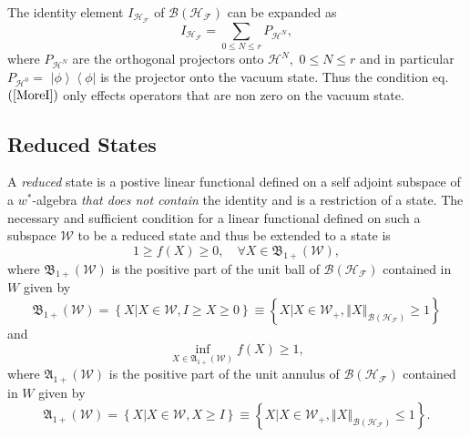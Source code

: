 \documentclass[aps,preprint]{revtex4}%
\begin{document}
The identity element $I_{\mathcal{H}_{\mathcal{F}}}$ of $\mathcal{B}\left(
\mathcal{H}_{\mathcal{F}}\right)  $ can be expanded as
\begin{equation}
I_{\mathcal{H}_{\mathcal{F}}}=\sum_{0\leq N\leq r}P_{\mathcal{H}^{N}},
\end{equation}
where $P_{\mathcal{H}^{N}}$ are the orthogonal projectors onto $\mathcal{H}%
^{N},$ $0\leq N\leq r$ and in particular $P_{\mathcal{H}^{0}}=$ $\left\vert
\phi\right\rangle \left\langle \phi\right\vert $ is the projector onto the
vacuum state. Thus the condition eq.$\left(  \ref{MoreI}\right)  $ only
effects operators that are non zero on the vacuum state.

\subsection{Reduced States \label{Reduced States}}

A \emph{reduced} state is a postive linear functional defined on a self
adjoint subspace of a $w^{\ast}$-algebra \emph{that does not contain} the
identity and is a restriction of a state. The necessary and sufficient
condition \cite{Segal} for a linear functional defined on such a subspace
$\mathcal{W}$ to be a reduced state and thus be extended to a state is
\begin{equation}
1\geq f\left(  X\right)  \geq0,\quad\forall X\in\mathfrak{B}_{1+}\left(
\mathcal{W}\right)  ,
\end{equation}
where $\mathfrak{B}_{1+}\left(  \mathcal{W}\right)  $ is the positive part of
the unit ball of $\mathcal{B}\left(  \mathcal{H}_{\mathcal{F}}\right)  $
contained in $W$ given by%
\begin{equation}
\mathfrak{B}_{1+}\left(  \mathcal{W}\right)  =\left\{  \left.  X\right\vert
X\in\mathcal{W},I\geq X\geq0\right\}  \equiv\left\{  \left.  X\right\vert
X\in\mathcal{W}_{+},\left\Vert X\right\Vert _{\mathcal{B}\left(
\mathcal{H}_{\mathcal{F}}\right)  }\geq1\right\}  \label{BallCond}%
\end{equation}
and
\begin{equation}
\inf_{X\in\mathfrak{A}_{1+}\left(  \mathcal{W}\right)  }f\left(  X\right)
\geq1,
\end{equation}
where $\mathfrak{A}_{1+}\left(  \mathcal{W}\right)  $ is the positive part of
the unit annulus of $\mathcal{B}\left(  \mathcal{H}_{\mathcal{F}}\right)  $
contained in $W$ given by
\begin{equation}
\mathfrak{A}_{1+}\left(  \mathcal{W}\right)  =\left\{  \left.  X\right\vert
X\in\mathcal{W},X\geq I\right\}  \equiv\left\{  \left.  X\right\vert
X\in\mathcal{W}_{+},\left\Vert X\right\Vert _{\mathcal{B}\left(
\mathcal{H}_{\mathcal{F}}\right)  }\leq1\right\}  . \label{AnnCon}%
\end{equation}
\end{document}
